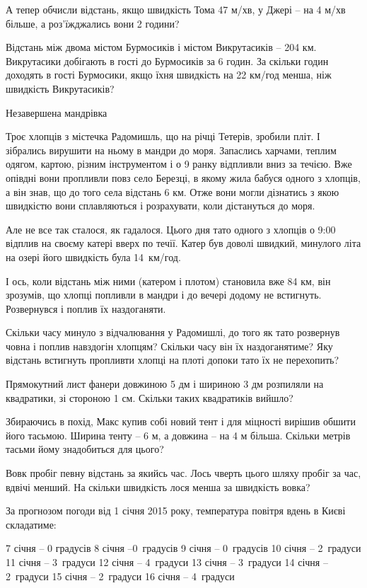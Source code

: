 А тепер обчисли відстань, якщо швидкість Тома 47 м/хв,
у Джері – на 4 м/хв більше, а роз’їжджались вони 2 години?


\problem
Відстань між двома містом Бурмосиків і містом Викрутасиків – 204 км.
Викрутасики добігають в гості до Бурмосиків за 6 годин.
За скільки годин доходять в гості Бурмосики,
якщо їхня швидкість на 22 км/год менша, ніж швидкість Викрутасиків?


\problem
Незавершена мандрівка

Троє хлопців з містечка Радомишль, що на річці Тетерів, зробили пліт.
І зібрались вирушити на ньому в мандри до моря. Запаслись харчами,
теплим одягом, картою, різним інструментом і о 9 ранку відпливли вниз
за течією. Вже опівдні вони пропливли повз село Березці, в якому жила
бабуся одного з хлопців, а він знав, що до того села відстань 6 км.
Отже вони могли дізнатись з якою швидкістю вони сплавляються
і розрахувати, коли дістануться до моря.

Але не все так сталося, як гадалося. Цього дня тато одного з хлопців
о 9:00 відплив на своєму катері вверх по течії. Катер був доволі швидкий,
минулого літа на озері його швидкість була 14 км/год.

І ось, коли відстань між ними (катером і плотом) становила вже 84 км,
він зрозумів, що хлопці попливли в мандри і до вечері додому не встигнуть.
Розвернувся і поплив їх наздоганяти.

Скільки часу минуло з відчалювання у Радомишлі, до того як тато
розвернув човна і поплив навздогін хлопцям?
Скільки часу він їх наздоганятиме?
Яку відстань встигнуть пропливти хлопці на плоті допоки тато їх не перехопить?


\problem
Прямокутний лист фанери довжиною 5 дм і шириною 3 дм розпиляли на квадратики,
зі стороною 1 см.
Скільки таких квадратиків вийшло?


\problem
Збираючись в похід, Макс купив собі новий тент і для міцності вирішив
обшити його тасьмою. Ширина тенту – 6 м, а довжина – на 4 м більша.
Скільки метрів тасьми йому знадобиться для цього?


\problem
Вовк пробіг певну відстань за якийсь час.
Лось чверть цього шляху пробіг за час, вдвічі менший.
На скільки швидкість лося менша за швидкість вовка?


\problem
За прогнозом погоди від 1 січня 2015 року, температура повітря вдень
в Києві складатиме:

7 січня – 0 градусів
8 січня –0 градусів
9 січня – 0 градусів
10 січня – 2 градуси
11 січня – 3 градуси
12 січня – 4 градуси
13 січня – 3 градуси
14 січня – 2 градуси
15 січня – 2 градуси
16 січня – 4 градуси

